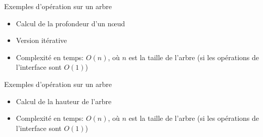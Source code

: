 \begin{frame}{Exemples d'opération sur un arbre}
\begin{itemize}
\item Calcul de la profondeur d'un n\oe ud

\begin{center}\small
{}
\end{center}
\item Version itérative

\begin{center}\small
{}
\end{center}
\item Complexité en temps: $O(n)$, où $n$ est la taille de l'arbre (si
  les opérations de l'interface sont $O(1)$)
\end{itemize}
\end{frame}

\begin{frame}{Exemples d'opération sur un arbre}
\begin{itemize}
\item Calcul de la hauteur de l'arbre

\begin{center}\small
{}
\end{center}

\item Complexité en temps: $O(n)$, où $n$ est la taille de l'arbre (si
  les opérations de l'interface sont $O(1)$)
\end{itemize}

\end{frame}

